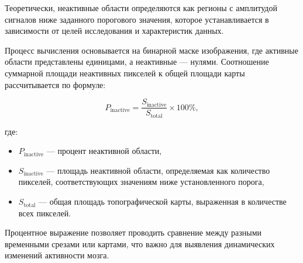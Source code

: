 Теоретически, неактивные области определяются как регионы с амплитудой сигналов ниже заданного порогового значения, которое устанавливается в зависимости от целей исследования и характеристик данных.

Процесс вычисления основывается на бинарной маске изображения, где активные области представлены единицами, а неактивные — нулями. Соотношение суммарной площади неактивных пикселей к общей площади карты рассчитывается по формуле:

\begin{equation}
P_{\text{inactive}} = \frac{S_{\text{inactive}}}{S_{\text{total}}} \times 100\%,
\end{equation}

где:
\begin{itemize}
    \item \( P_{\text{inactive}} \) — процент неактивной области,
    \item \( S_{\text{inactive}} \) — площадь неактивной области, определяемая как количество пикселей, соответствующих значениям ниже установленного порога,
    \item \( S_{\text{total}} \) — общая площадь топографической карты, выраженная в количестве всех пикселей.
\end{itemize}

Процентное выражение позволяет проводить сравнение между разными временными срезами или картами, что важно для выявления динамических изменений активности мозга.

\endinput